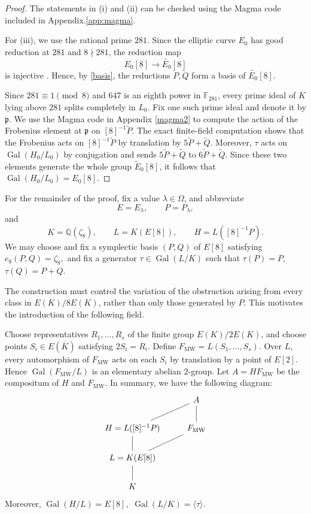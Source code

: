 \documentclass[11pt,a4paper]{amsart}
\theoremstyle{definition}
\newcommand{\Gal}{\operatorname{Gal}}
\numberwithin{equation}{section}
\begin{document}
\begin{proof}
The statements in (i) and (ii) can be checked using the Magma code included in Appendix.\ref{app:magma}. 

For (iii), we use the rational prime \(281\). Since the elliptic curve \(E_0\) has good reduction at \(281\) and \(8\nmid 281\), the reduction map
\[
E_0[8]\longrightarrow \widetilde{E_0}[8]
\]
is injective \cite[Chapter VII, Proposition 3.1]{Sil}. Hence, by \ref{basis}, the reductions \(\widetilde{P},\widetilde{Q}\) form a basis of \(\widetilde{E_0}[8]\).

Since \(281\equiv 1\pmod{8}\) and \(647\) is an eighth power in \(\mathbb{F}_{281}\), every prime ideal of \(K\) lying above \(281\) splits completely in \(L_0\). Fix one such prime ideal and denote it by \(\mathfrak{p}\). We use the Magma code in Appendix \ref{magma2} to compute the action of the Frobenius element at \(\mathfrak{p}\) on \([8]^{-1}\widetilde{P}\). The exact finite-field computation shows that the Frobenius acts on \([8]^{-1}\widetilde{P}\) by translation by $5\widetilde{P}+\widetilde{Q}$. Moreover,  \(\tau\) acts on \(\Gal(H_0/L_0)\) by conjugation and sends $
5\widetilde{P}+\widetilde{Q}
$ to $ 6\widetilde{P}+\widetilde{Q}$. Since these two elements generate the whole group \(\widetilde{E}_0[8]\), it follows that $\Gal(H_0/L_0)=E_0[8]$.



\end{proof}


For the remainder of the proof, fix a value $\lambda\in\Omega$, and
abbreviate
\[
E=E_\lambda,\qquad P=P_\lambda,
\]
and
\[
K=\mathbb{Q}(\zeta_8),\qquad
L=K(E[8]),\qquad
H=L([8]^{-1}P).
\]
We may choose  and fix a symplectic basis
$(P,Q)$ of $E[8]$ satisfying
$
e_8(P,Q)=\zeta_8,
$
and fix a generator $\tau\in\Gal(L/K)$ such that
$
\tau(P)=P$, $ \tau(Q)=P+Q.
$

The construction must control the variation of the obstruction arising
from every class in $E(K)/8E(K)$, rather than only those generated by
$P$. This motivates the introduction of the following field.

Choose representatives
$
R_1,\ldots,R_s
$
of the finite group $E(K)/2E(K)$, and choose points
$S_i\in E(\overline{K})$ satisfying $2S_i=R_i$.
Define
$\label{eq:FMW}
	F_{\mathrm{MW}}=L(S_1,\ldots,S_s).
$
Over $L$, every automorphism of $F_{\mathrm{MW}}$ acts on each $S_i$
by translation by a point of $E[2]$. Hence $\Gal(F_{\mathrm{MW}}/L)$ is an elementary abelian $2$-group. Let $A=HF_{\mathrm{MW}}$ be the compositum of $H$ and $F_{\mathrm{MW}}$. In summary, we have the
following diagram:
\begin{equation}
	\begin{tikzcd}
		&A\ar[dl,no head]\ar[d,no head]\\
		H=L([8]^{-1}P)\ar[d,no head]&F_{\mathrm{MW}}\ar[dl,no head]\\
		L=K(E[8])\ar[d,no head]&\\
		K&
	\end{tikzcd}
\end{equation}
Moreover,
$
\Gal(H/L)=E[8],$
$\Gal(L/K)=\langle\tau\rangle .
$
\end{document}
